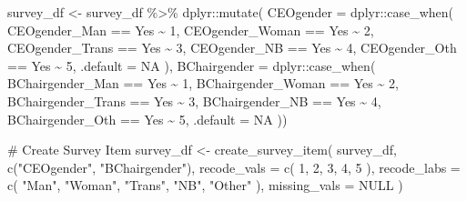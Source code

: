 \documentclass[
  letterpaper,
]{scrbook}
\newenvironment{Shaded}{\begin{snugshade}}{\end{snugshade}}
\newcommand{\AttributeTok}[1]{\textcolor[rgb]{0.40,0.45,0.13}{#1}}
\newcommand{\CommentTok}[1]{\textcolor[rgb]{0.37,0.37,0.37}{#1}}
\newcommand{\ConstantTok}[1]{\textcolor[rgb]{0.56,0.35,0.01}{#1}}
\newcommand{\DecValTok}[1]{\textcolor[rgb]{0.68,0.00,0.00}{#1}}
\newcommand{\FunctionTok}[1]{\textcolor[rgb]{0.28,0.35,0.67}{#1}}
\newcommand{\NormalTok}[1]{\textcolor[rgb]{0.00,0.23,0.31}{#1}}
\newcommand{\OtherTok}[1]{\textcolor[rgb]{0.00,0.23,0.31}{#1}}
\newcommand{\SpecialCharTok}[1]{\textcolor[rgb]{0.37,0.37,0.37}{#1}}
\newcommand{\StringTok}[1]{\textcolor[rgb]{0.13,0.47,0.30}{#1}}
\begin{document}
\begin{Shaded}
\begin{Highlighting}[]
\NormalTok{survey\_df }\OtherTok{\textless{}{-}}\NormalTok{ survey\_df }\SpecialCharTok{\%\textgreater{}\%}
\NormalTok{  dplyr}\SpecialCharTok{::}\FunctionTok{mutate}\NormalTok{(}
    \AttributeTok{CEOgender =}\NormalTok{ dplyr}\SpecialCharTok{::}\FunctionTok{case\_when}\NormalTok{(}
\NormalTok{      CEOgender\_Man }\SpecialCharTok{==} \StringTok{\textquotesingle{}Yes\textquotesingle{}} \SpecialCharTok{\textasciitilde{}} \DecValTok{1}\NormalTok{,}
\NormalTok{      CEOgender\_Woman }\SpecialCharTok{==} \StringTok{\textquotesingle{}Yes\textquotesingle{}} \SpecialCharTok{\textasciitilde{}} \DecValTok{2}\NormalTok{,}
\NormalTok{      CEOgender\_Trans }\SpecialCharTok{==} \StringTok{\textquotesingle{}Yes\textquotesingle{}} \SpecialCharTok{\textasciitilde{}} \DecValTok{3}\NormalTok{,}
\NormalTok{      CEOgender\_NB }\SpecialCharTok{==} \StringTok{\textquotesingle{}Yes\textquotesingle{}} \SpecialCharTok{\textasciitilde{}} \DecValTok{4}\NormalTok{,}
\NormalTok{      CEOgender\_Oth }\SpecialCharTok{==} \StringTok{\textquotesingle{}Yes\textquotesingle{}} \SpecialCharTok{\textasciitilde{}} \DecValTok{5}\NormalTok{,}
      \AttributeTok{.default =} \ConstantTok{NA}
\NormalTok{    ),}
    \AttributeTok{BChairgender =}\NormalTok{ dplyr}\SpecialCharTok{::}\FunctionTok{case\_when}\NormalTok{(}
\NormalTok{      BChairgender\_Man }\SpecialCharTok{==} \StringTok{\textquotesingle{}Yes\textquotesingle{}} \SpecialCharTok{\textasciitilde{}} \DecValTok{1}\NormalTok{,}
\NormalTok{      BChairgender\_Woman }\SpecialCharTok{==} \StringTok{\textquotesingle{}Yes\textquotesingle{}} \SpecialCharTok{\textasciitilde{}} \DecValTok{2}\NormalTok{,}
\NormalTok{      BChairgender\_Trans }\SpecialCharTok{==} \StringTok{\textquotesingle{}Yes\textquotesingle{}} \SpecialCharTok{\textasciitilde{}} \DecValTok{3}\NormalTok{,}
\NormalTok{      BChairgender\_NB }\SpecialCharTok{==} \StringTok{\textquotesingle{}Yes\textquotesingle{}} \SpecialCharTok{\textasciitilde{}} \DecValTok{4}\NormalTok{,}
\NormalTok{      BChairgender\_Oth }\SpecialCharTok{==} \StringTok{\textquotesingle{}Yes\textquotesingle{}} \SpecialCharTok{\textasciitilde{}} \DecValTok{5}\NormalTok{,}
      \AttributeTok{.default =} \ConstantTok{NA}
\NormalTok{  ))}

\CommentTok{\# Create Survey Item}
\NormalTok{survey\_df }\OtherTok{\textless{}{-}} \FunctionTok{create\_survey\_item}\NormalTok{(}
\NormalTok{  survey\_df, }
  \FunctionTok{c}\NormalTok{(}\StringTok{"CEOgender"}\NormalTok{, }\StringTok{"BChairgender"}\NormalTok{), }
  \AttributeTok{recode\_vals =} \FunctionTok{c}\NormalTok{( }\DecValTok{1}\NormalTok{, }\DecValTok{2}\NormalTok{, }\DecValTok{3}\NormalTok{, }\DecValTok{4}\NormalTok{, }\DecValTok{5}\NormalTok{ ), }
  \AttributeTok{recode\_labs =} \FunctionTok{c}\NormalTok{( }\StringTok{"Man"}\NormalTok{, }\StringTok{"Woman"}\NormalTok{, }\StringTok{"Trans"}\NormalTok{, }\StringTok{"NB"}\NormalTok{, }\StringTok{"Other"}\NormalTok{ ), }
  \AttributeTok{missing\_vals =} \ConstantTok{NULL}
\NormalTok{)}
\end{Highlighting}
\end{Shaded}
\end{document}
